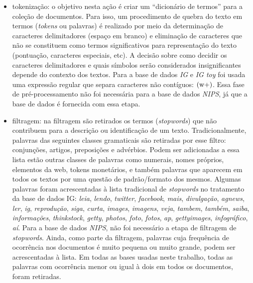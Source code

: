 \documentclass[
    12pt,                %
    oneside,            %
    a4paper,            %
    english,            %
    brazil                %
    ]{abntex2ppgsi}
\begin{document}
\begin{itemize}
    \item tokenização: o objetivo nesta ação é criar um ``dicionário de termos'' para a coleção de documentos. Para isso, um procedimento de quebra do texto em termos (\textit{tokens} ou palavras) é realizado por meio da determinação de caracteres delimitadores (espaço em branco) e eliminação de caracteres que não se constituem como termos significativos para representação do texto (pontuação, caracteres especiais, etc). A decisão sobre como decidir os caracteres delimitadores e quais símbolos serão considerados insignificantes depende do contexto dos textos. Para a base de dados \textit{IG} e \textit{IG toy} foi usada uma expressão regular que separa caracteres não contíguos: $\text{(\\w+)}$. Essa fase de pré-processamento não foi necessária para a base de dados \textit{NIPS}, já que a base de dados é fornecida com essa etapa.
    \item filtragem: na filtragem são retirados os termos (\textit{stopwords}) que não contribuem para a descrição ou identificação de um texto. Tradicionalmente, palavras das seguintes classes gramaticais são retiradas por esse filtro: conjunções, artigos, preposições e advérbios. Podem ser adicionadas a essa lista estão outras classes de palavras como numerais, nomes próprios, elementos da web, tokens monetários, e também palavras que aparecem em todos os textos por uma questão de padrão/formato dos mesmos. Algumas palavras foram acrescentadas à lista tradicional de \textit{stopwords} no tratamento da base de dados IG: \textit{leia}, \textit{lendo}, \textit{twitter}, \textit{facebook}, \textit{mais}, \textit{divulgação}, \textit{agnews}, \textit{ler}, \textit{ig}, \textit{reprodução}, \textit{siga}, \textit{curta}, \textit{images}, \textit{imagens}, \textit{veja}, \textit{tambem}, \textit{também}, \textit{saiba}, \textit{informações}, \textit{thinkstock}, \textit{getty}, \textit{photos}, \textit{foto}, \textit{fotos}, \textit{ap}, \textit{gettyimages}, \textit{infográfico}, \textit{aí}. Para a base de dados \textit{NIPS}, não foi necessário a etapa de filtragem de \textit{stopwords}. Ainda, como parte da filtragem, palavras cuja frequência de ocorrência nos documentos é muito pequena ou muito grande, podem ser acrescentadas à lista. Em todas as bases usadas neste trabalho, todas as palavras com ocorrência menor ou igual à dois em todos os documentos, foram retiradas.
\end{itemize}
\end{document}
